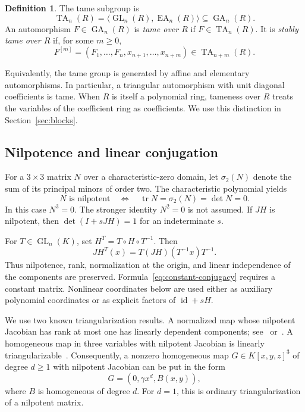 \documentclass[11pt,reqno]{amsart}
\theoremstyle{definition}
\newtheorem{definition}[theorem]{Definition}
\theoremstyle{remark}
\numberwithin{equation}{section}
\DeclareMathOperator{\GL}{GL}
\DeclareMathOperator{\GA}{GA}
\DeclareMathOperator{\TA}{TA}
\DeclareMathOperator{\EA}{EA}
\DeclareMathOperator{\tr}{tr}
\DeclareMathOperator{\id}{id}
\begin{document}
\begin{definition}\label{def:tame}
The tame subgroup is
\[
 \TA_n(R)=\langle\GL_n(R),\EA_n(R)\rangle\subseteq\GA_n(R).
\]
An automorphism $F\in\GA_n(R)$ is \emph{tame over $R$} if $F\in\TA_n(R)$. It is \emph{stably tame over $R$} if, for some $m\geq0$,
\[
 F^{[m]}=(F_1,\ldots,F_n,x_{n+1},\ldots,x_{n+m})\in\TA_{n+m}(R).
\]
\end{definition}

Equivalently, the tame group is generated by affine and elementary automorphisms. In particular, a triangular automorphism with unit diagonal coefficients is tame. When $R$ is itself a polynomial ring, tameness over $R$ treats the variables of the coefficient ring as coefficients. We use this distinction in Section~\ref{sec:blocks}.

\subsection{Nilpotence and linear conjugation}
For a $3\times3$ matrix $N$ over a characteristic-zero domain, let $\sigma_2(N)$ denote the sum of its principal minors of order two. The characteristic polynomial yields
\begin{equation}\label{eq:nilpotence}
 N\text{ is nilpotent}
 \quad\Longleftrightarrow\quad
 \tr N=\sigma_2(N)=\det N=0.
\end{equation}
In this case $N^3=0$. The stronger identity $N^2=0$ is not assumed. If $JH$ is nilpotent, then $\det(I+sJH)=1$ for an indeterminate $s$.

For $T\in\GL_n(K)$, set $H^T=T\circ H\circ T^{-1}$. Then
\begin{equation}\label{eq:constant-conjugacy}
 JH^T(x)=T(JH)(T^{-1}x)T^{-1}.
\end{equation}
Thus nilpotence, rank, normalization at the origin, and linear independence of the components are preserved. Formula~\eqref{eq:constant-conjugacy} requires a constant matrix. Nonlinear coordinates below are used either as auxiliary polynomial coordinates or as explicit factors of $\id+sH$.

We use two known triangularization results. A normalized map whose nilpotent Jacobian has rank at most one has linearly dependent components; see~\cite{BCW} or~\cite[Theorems~2.3 and~3.4]{deBondtYan2014}. A homogeneous map in three variables with nilpotent Jacobian is linearly triangularizable~\cite{deBondtEssen}. Consequently, a nonzero homogeneous map $G\in K[x,y,z]^3$ of degree $d\geq1$ with nilpotent Jacobian can be put in the form
\begin{equation}\label{eq:homogeneous-form}
 G=(0,\gamma x^d,B(x,y)),
\end{equation}
where $B$ is homogeneous of degree $d$. For $d=1$, this is ordinary triangularization of a nilpotent matrix.
\end{document}
